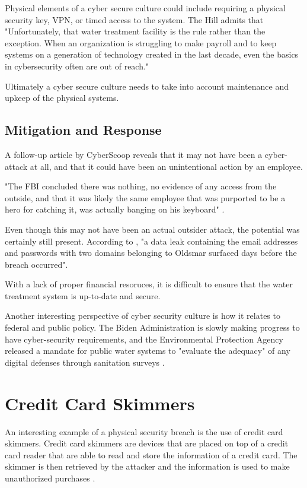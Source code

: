 \documentclass[acmsmall]{acmart}
\begin{document}
Physical elements of a cyber secure culture could include requiring a physical
security key, VPN, or timed access to the system. The Hill \cite{HillArticle}
admits that "Unfortunately, that water treatment facility is the rule rather than
the exception. When an organization is struggling to make payroll and to keep systems
on a generation of technology created in the last decade, even the basics in cybersecurity
often are out of reach."

Ultimately a cyber secure culture needs to take into account maintenance and
upkeep of the physical systems.

\subsection{Mitigation and Response}
A follow-up article by CyberScoop \cite{CyberScoop} reveals that it may not have
been a cyber-attack at all, and that it could have been an unintentional action by an
employee.

"The FBI concluded there was nothing, no evidence of any access from the outside,
and that it was likely the same employee that was purported to be a hero for catching
it, was actually banging on his keyboard" \cite{CyberScoop}.

Even though this may not have been an actual outsider attack, the potential was certainly
still present. According to \cite{CyberScoop}, "a data leak containing the email
addresses and passwords with two domains belonging to Oldsmar surfaced days before the
breach occurred".

With a lack of proper financial resoruces, it is difficult to ensure that the
water treatment system is up-to-date and secure.

Another interesting perspective of cyber security culture is how it relates to
federal and public policy. The Biden Administration is slowly making progress
to have cyber-security requirements, and the Environmental Protection Agency released
a mandate for public water systems to "evaluate the adequacy" of any digital defenses
through sanitation surveys \cite{CyberScoopEPA}.

\section{Credit Card Skimmers}
An interesting example of a physical security breach is the use of credit card skimmers.
Credit card skimmers are devices that are placed on top of a credit card reader that
are able to read and store the information of a credit card. The skimmer is then
retrieved by the attacker and the information is used to make unauthorized purchases \cite{FBISkimming}.
\end{document}
